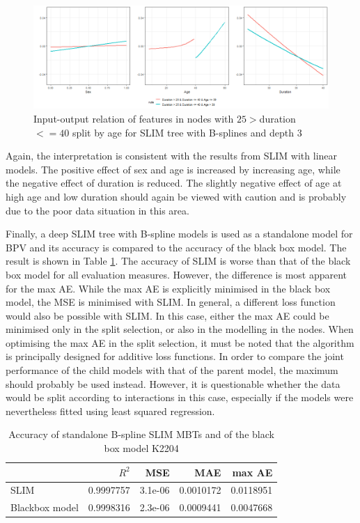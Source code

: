\begin{figure}[!htb]
    \centering    
    \includegraphics[width = 16cm]{Figures/insurance_use_case/k2204_BPV/effects_age_medium_duration.png}
    \caption{Input-output relation of features in nodes with $25 > $duration $<= 40$ split by age for SLIM tree with B-splines and depth 3}
    \label{fig:ins_k2204_effects_age_medium_duration}
\end{figure}

Again, the interpretation is consistent with the results from SLIM with linear models. The positive effect of sex and age is increased by increasing age, while the negative effect of duration is reduced. The slightly negative effect of age at high age and low duration should again be viewed with caution and is probably due to the poor data situation in this area.


Finally, a deep SLIM tree with B-spline models is used as a standalone model for BPV and its accuracy is compared to the accuracy of the black box model. The result is shown in Table \ref{tab:ins_k2204_standalone_slim}.
The accuracy of SLIM is worse than that of the black box model for all evaluation measures. However, the difference is most apparent for the max AE. While the max AE is explicitly minimised in the black box model, the MSE is minimised with SLIM. In general, a different loss function would also be possible with SLIM. In this case, either the max AE could be minimised only in the split selection, or also in the modelling in the nodes. When optimising the max AE in the split selection, it must be noted that the algorithm is principally designed for additive loss functions. In order to compare the joint performance of the child models with that of the parent model, the maximum should probably be used instead. 
However, it is questionable whether the data would be split according to interactions in this case, especially if the models were nevertheless fitted using least squared regression.

\begin{table}[!htb]

\centering \scriptsize
\begin{tabular}[t]{l|r|r|r|r}
\hline
  & $R^2$ & MSE & MAE & max AE \\
\hline
SLIM & 0.9997757 & 3.1e-06 & 0.0010172 & 0.0118951\\
Blackbox model & 0.9998316 & 2.3e-06 & 0.0009441 & 0.0047668\\
\hline
\end{tabular}
\caption{Accuracy of standalone B-spline SLIM MBTs and of the black box model K2204}
\label{tab:ins_k2204_standalone_slim}
\end{table}









